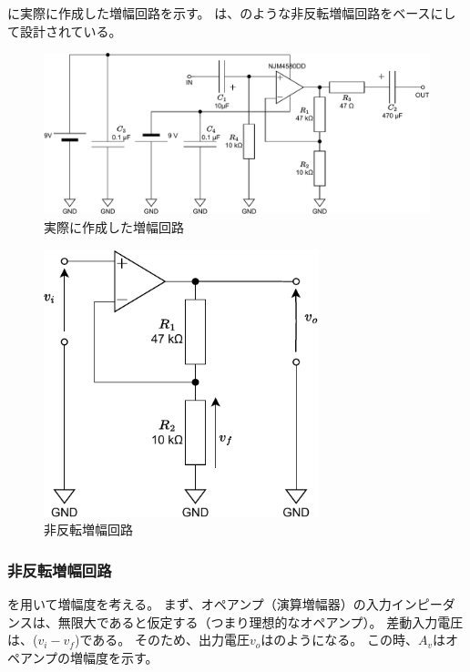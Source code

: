 \documentclass[report.tex]{subfiles}
\begin{document}
に実際に作成した増幅回路を示す。
は、のような非反転増幅回路をベースにして設計されている。

\begin{figure}[H]
	\centering
	\includegraphics[width=15cm]{fig/amp.pdf}
	\caption{実際に作成した増幅回路}
	\label{fig:amplifier-circuit}
\end{figure}

\begin{figure}[H]
	\centering
	\includegraphics[width=8cm]{fig/amp2.pdf}
	\caption{非反転増幅回路}
	\label{fig:amplifier-circuit2}
\end{figure}

\subsubsection{非反転増幅回路}

を用いて増幅度を考える。
まず、オペアンプ（演算増幅器）の入力インピーダンスは、無限大であると仮定する（つまり理想的なオペアンプ）。
差動入力電圧は、(\(v_i - v_f\))である。
そのため、出力電圧\(v_o\)はのようになる。
この時、\(A_v\)はオペアンプの増幅度を示す。
\end{document}
